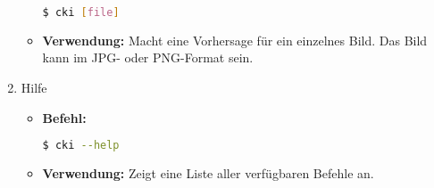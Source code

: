 \begin{enumerate}
\begin{itemize}
\begin{lstlisting}[language=bash]
$ cki [file]
								\end{lstlisting}
					\item \textbf{Verwendung:} Macht eine Vorhersage für ein einzelnes Bild. Das Bild kann im JPG- oder PNG-Format sein.
				\end{itemize}
	\item Hilfe
				\begin{itemize}
					\item \textbf{Befehl:}
								\begin{lstlisting}[language=bash]
$ cki --help
								\end{lstlisting}
					\item \textbf{Verwendung:} Zeigt eine Liste aller verfügbaren Befehle an.
				\end{itemize}
\end{enumerate}